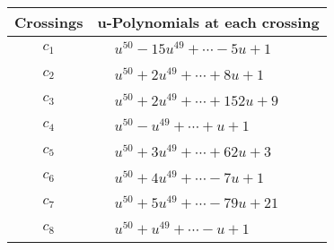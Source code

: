\documentclass[1p]{elsarticle_modified}
\theoremstyle{definition}
\begin{document}
\begin{tabular}{m{50pt}|m{274pt}}
Crossings & \hspace{64pt}u-Polynomials at each crossing \\
\hline $$\begin{aligned}c_{1}\end{aligned}$$&$\begin{aligned}
&u^{50}-15 u^{49}+\cdots-5 u+1
\end{aligned}$\\
\hline $$\begin{aligned}c_{2}\end{aligned}$$&$\begin{aligned}
&u^{50}+2 u^{49}+\cdots+8 u+1
\end{aligned}$\\
\hline $$\begin{aligned}c_{3}\end{aligned}$$&$\begin{aligned}
&u^{50}+2 u^{49}+\cdots+152 u+9
\end{aligned}$\\
\hline $$\begin{aligned}c_{4}\end{aligned}$$&$\begin{aligned}
&u^{50}- u^{49}+\cdots+u+1
\end{aligned}$\\
\hline $$\begin{aligned}c_{5}\end{aligned}$$&$\begin{aligned}
&u^{50}+3 u^{49}+\cdots+62 u+3
\end{aligned}$\\
\hline $$\begin{aligned}c_{6}\end{aligned}$$&$\begin{aligned}
&u^{50}+4 u^{49}+\cdots-7 u+1
\end{aligned}$\\
\hline $$\begin{aligned}c_{7}\end{aligned}$$&$\begin{aligned}
&u^{50}+5 u^{49}+\cdots-79 u+21
\end{aligned}$\\
\hline $$\begin{aligned}c_{8}\end{aligned}$$&$\begin{aligned}
&u^{50}+u^{49}+\cdots- u+1
\end{aligned}$\\

\end{tabular}
\end{document}

